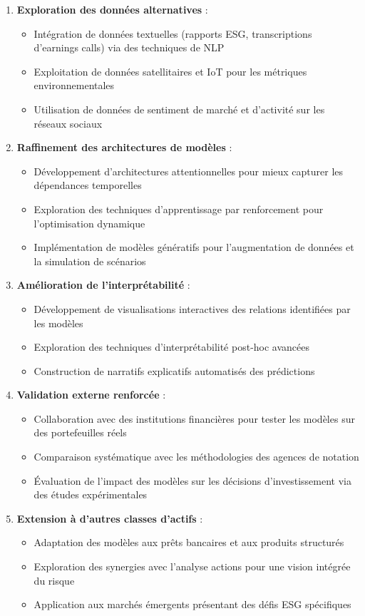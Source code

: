 \begin{enumerate}
  \item \textbf{Exploration des données alternatives} :
  \begin{itemize}
    \item Intégration de données textuelles (rapports ESG, transcriptions d'earnings calls) via des techniques de NLP
    \item Exploitation de données satellitaires et IoT pour les métriques environnementales
    \item Utilisation de données de sentiment de marché et d'activité sur les réseaux sociaux
  \end{itemize}

  \item \textbf{Raffinement des architectures de modèles} :
  \begin{itemize}
    \item Développement d'architectures attentionnelles pour mieux capturer les dépendances temporelles
    \item Exploration des techniques d'apprentissage par renforcement pour l'optimisation dynamique
    \item Implémentation de modèles génératifs pour l'augmentation de données et la simulation de scénarios
  \end{itemize}

  \item \textbf{Amélioration de l'interprétabilité} :
  \begin{itemize}
    \item Développement de visualisations interactives des relations identifiées par les modèles
    \item Exploration des techniques d'interprétabilité post-hoc avancées
    \item Construction de narratifs explicatifs automatisés des prédictions
  \end{itemize}

  \item \textbf{Validation externe renforcée} :
  \begin{itemize}
    \item Collaboration avec des institutions financières pour tester les modèles sur des portefeuilles réels
    \item Comparaison systématique avec les méthodologies des agences de notation
    \item Évaluation de l'impact des modèles sur les décisions d'investissement via des études expérimentales
  \end{itemize}

  \item \textbf{Extension à d'autres classes d'actifs} :
  \begin{itemize}
    \item Adaptation des modèles aux prêts bancaires et aux produits structurés
    \item Exploration des synergies avec l'analyse actions pour une vision intégrée du risque
    \item Application aux marchés émergents présentant des défis ESG spécifiques
  \end{itemize}
\end{enumerate}

